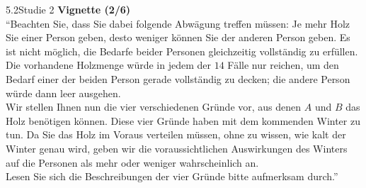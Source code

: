\documentclass[xcolor=table,9pt,aspectratio=169]{beamer}
\begin{document}
\begin{frame}{\vspace*{10mm}5.2\hspace*{1em}Studie 2}
\textbf{Vignette (2/6)}\\
\medskip
\enquote{Beachten Sie, dass Sie dabei folgende Abwägung treffen müssen: Je mehr Holz Sie einer Person geben, desto weniger können Sie der anderen Person geben. Es ist nicht möglich, die Bedarfe beider Personen gleichzeitig vollständig zu erfüllen. Die vorhandene Holzmenge würde in jedem der $14$ Fälle nur reichen, um den Bedarf einer der beiden Person gerade vollständig zu decken; die andere Person würde dann leer ausgehen.\\
\medskip
Wir stellen Ihnen nun die vier verschiedenen Gründe vor, aus denen $A$ und $B$ das Holz benötigen können. Diese vier Gründe haben mit dem kommenden Winter zu tun. Da Sie das Holz im Voraus verteilen müssen, ohne zu wissen, wie kalt der Winter genau wird, geben wir die voraussichtlichen Auswirkungen des Winters auf die Personen als mehr oder weniger wahrscheinlich an.\\
\medskip
Lesen Sie sich die Beschreibungen der vier Gründe bitte aufmerksam durch.}
\end{frame}
\end{document}
